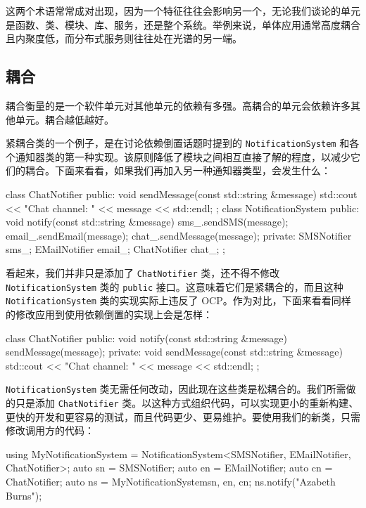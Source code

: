 这两个术语常常成对出现，因为一个特征往往会影响另一个，无论我们谈论的单元是函数、类、模块、库、服务，还是整个系统。举例来说，单体应用通常高度耦合且内聚度低，而分布式服务则往往处在光谱的另一端。

\subsection{耦合}

\label{idx:068}
耦合衡量的是一个软件单元对其他单元的依赖有多强。高耦合的单元会依赖许多其他单元。耦合越低越好。

紧耦合类的一个例子，是在讨论依赖倒置话题时提到的 \texttt{Notification\allowbreak{}System} 和各个通知器类的第一种实现。该原则降低了模块之间相互直接了解的程度，以减少它们的耦合。下面来看看，如果我们再加入另一种通知器类型，会发生什么：

\begin{codebox}[cpp]
class ChatNotifier {
public:
    void sendMessage(const std::string &message) {
        std::cout << "Chat channel: " << message << std::endl;
    }
};
class NotificationSystem {
public:
    void notify(const std::string &message) {
        sms_.sendSMS(message);
        email_.sendEmail(message);
        chat_.sendMessage(message);
    }
private:
    SMSNotifier sms_;
    EMailNotifier email_;
    ChatNotifier chat_;
};
\end{codebox}

看起来，我们并非只是添加了 \texttt{Chat\allowbreak{}Notifier} 类，还不得不修改 \texttt{Notification\allowbreak{}System} 类的 \texttt{public} 接口。这意味着它们是紧耦合的，而且这种 \texttt{Notification\allowbreak{}System} 类的实现实际上违反了 OCP。作为对比，下面来看看同样的修改应用到使用依赖倒置的实现上会是怎样：

\begin{codebox}[cpp]
class ChatNotifier {
public:
    void notify(const std::string &message) { sendMessage(message);  }
private:
    void sendMessage(const std::string &message) {
        std::cout << "Chat channel: " << message << std::endl;
    }
};
\end{codebox}

\label{idx:069}
\texttt{Notification\allowbreak{}System} 类无需任何改动，因此现在这些类是松耦合的。我们所需做的只是添加 \texttt{Chat\allowbreak{}Notifier} 类。以这种方式组织代码，可以实现更小的重新构建、更快的开发和更容易的测试，而且代码更少、更易维护。要使用我们的新类，只需修改调用方的代码：

\begin{codebox}[text]
using MyNotificationSystem =
    NotificationSystem<SMSNotifier, EMailNotifier, ChatNotifier>;
auto sn = SMSNotifier{};
auto en = EMailNotifier{};
auto cn = ChatNotifier{};
auto ns = MyNotificationSystem{{sn, en, cn}};
ns.notify("Azabeth Burns");
\end{codebox}

